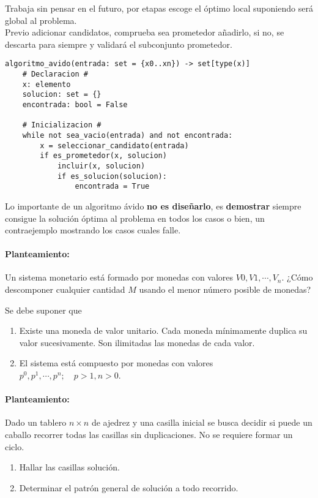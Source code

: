 Trabaja sin pensar en el futuro, por etapas escoge el óptimo local suponiendo será global al problema.\\
Previo adicionar candidatos, comprueba sea prometedor añadirlo, si no, se descarta para siempre y validará el subconjunto prometedor.

\begin{lstlisting}
algoritmo_avido(entrada: set = {x0..xn}) -> set[type(x)]
    # Declaracion #
    x: elemento
    solucion: set = {}
    encontrada: bool = False

    # Inicializacion #
    while not sea_vacio(entrada) and not encontrada:
        x = seleccionar_candidato(entrada)
        if es_prometedor(x, solucion)
            incluir(x, solucion)
            if es_solucion(solucion):
                encontrada = True
\end{lstlisting}


Lo importante de un algoritmo ávido \textbf{no es diseñarlo}, es \textbf{demostrar} siempre consigue la solución óptima al problema en todos los casos o bien, un contraejemplo mostrando los casos cuales falle.

\begin{example}
	\paragraph{Planteamiento:}
	\begin{definition}
		Un sistema monetario está formado por monedas con valores $V0, V1, \cdots, V_n$. ¿Cómo descomponer cualquier cantidad $M$ usando el menor número posible de monedas?

		Se debe suponer que
		\begin{enumerate}
			\item Existe una moneda de valor unitario. Cada moneda mínimamente duplica su valor sucesivamente. Son ilimitadas las monedas de cada valor.
			\item El sistema está compuesto por monedas con valores $p^0,p^1,\cdots,p^n;\quad p>1,n>0$.
		\end{enumerate}
	\end{definition}
\end{example}

\begin{example}
	\paragraph{Planteamiento:}
	\begin{definition}
		Dado un tablero $n\times n$ de ajedrez y una casilla inicial se busca decidir si puede un caballo recorrer todas las casillas sin duplicaciones. No se requiere formar un ciclo.
		\begin{enumerate}
			\item Hallar las casillas solución.
			\item Determinar el patrón general de solución a todo recorrido.
		\end{enumerate}
	\end{definition}
\end{example}
